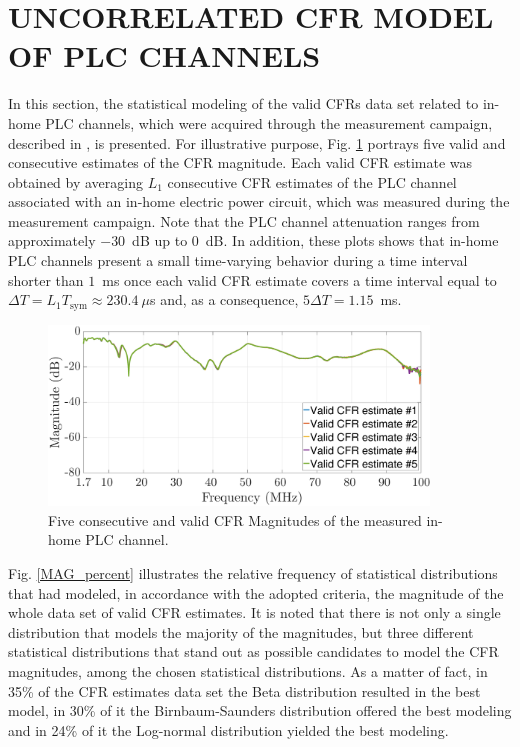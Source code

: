 \section{UNCORRELATED CFR MODEL OF PLC CHANNELS}\label{sec:NR2}

In this section, the statistical modeling of the valid \acp{CFR} data set related to in-home \ac{PLC} channels, which were acquired through the measurement campaign, described in \cite{Thiago:Characterization}, is presented. For illustrative purpose, Fig. \ref{respfreq} portrays five valid and consecutive estimates of the \ac{CFR} magnitude. Each valid \ac{CFR} estimate was obtained by averaging  $L_1$ consecutive \ac{CFR} estimates of the \ac{PLC} channel associated with an in-home electric power circuit, which was measured during the measurement campaign. Note that the \ac{PLC} channel attenuation ranges from approximately $-30$~dB up to $0$~dB. In addition, these plots shows that in-home \ac{PLC} channels present a small time-varying behavior during a time interval shorter than $1$~ms once each valid \ac{CFR} estimate covers a time interval equal to $\Delta T = L_1 T_{\textrm{sym}} \approx 230.4~\mu$s and, as a consequence, $5\Delta T = 1.15$~ms. 

\begin{figure}[h]
	\centering
	\includegraphics[width=0.9\textwidth]{images/respfreq_17.eps}
	\caption{Five consecutive and valid CFR Magnitudes of the measured in-home PLC channel.}
	\label{respfreq}
\end{figure}

Fig. \ref{MAG_percent} illustrates the relative frequency of statistical distributions that had modeled, in accordance with the adopted criteria, the magnitude of the whole data set of valid \ac{CFR} estimates. It is noted that there is not only a single distribution that models the majority of the magnitudes, but three different statistical distributions that stand out as possible candidates to model the \ac{CFR} magnitudes, among the chosen statistical distributions. As a matter of fact, in 35\% of the \ac{CFR} estimates data set the Beta distribution resulted in the best model, in 30\% of it the Birnbaum-Saunders distribution offered the best modeling and in 24\% of it the Log-normal distribution yielded the best modeling. 

